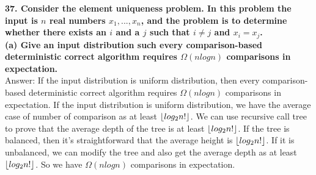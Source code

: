\documentclass{article}
\DeclarePairedDelimiter\floor{\lfloor}{\rfloor}
\begin{document}
\textbf{37. Consider the element uniqueness problem. In this problem the input is $n$ real numbers $x_1,..., x_n$, and the problem is to determine whether there exists an $i$ and a $j$ such that $i\neq j$ and $x_i = x_j$.}\\\newline
\textbf{(a) Give an input distribution such every comparison-based deterministic correct algorithm requires $\Omega(nlogn)$ comparisons in expectation.} \\ \newline
Answer: If the input distribution is uniform distribution, then every comparison-based deterministic correct algorithm requires $\Omega(nlogn)$ comparisons in expectation. If the input distribution is uniform distribution, we have the average case of number of comparison as at least $\floor{log_2n!}$. We can use recursive call tree to prove that the average depth of the tree is at least $\floor{log_2n!}$. If the tree is balanced, then it's straightforward that the average height is $\floor{log_2n!}$. If it is unbalanced, we can modify the tree and also get the average depth as at least $\floor{log_2n!}$. So we have $\Omega(nlogn)$ comparisons in expectation.
\end{document}

